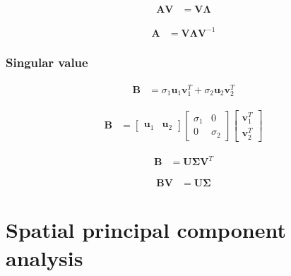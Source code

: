 \documentclass{article}
\begin{document}
\begin{align}
	\mathbf{A}\mathbf{V} & =\mathbf{V}\mathbf{\Lambda}
\end{align}

\begin{align}
	\mathbf{A} & =\mathbf{V}\mathbf{\Lambda}\mathbf{V}^{-1}
\end{align}

\subsubsection{Singular value}

\begin{align}
	\mathbf{B} & =\sigma_{1}\mathbf{u}_{1}\mathbf{v}_{1}^{T}+\sigma_{2}\mathbf{u}_{2}\mathbf{v}_{2}^{T}
\end{align}

\begin{align}
	\mathbf{B} & =\left[\begin{array}{cc}
		\mathbf{u}_{1} & \mathbf{u}_{2}\end{array}\right]\left[\begin{array}{cc}
		\sigma_{1} & 0\\
		0 & \sigma_{2}
	\end{array}\right]\left[\begin{array}{c}
		\mathbf{v}_{1}^{T}\\
		\mathbf{v}_{2}^{T}
	\end{array}\right]
\end{align}

\begin{align}
	\mathbf{B} & =\mathbf{U}\mathbf{\Sigma}\mathbf{V}^{T}
\end{align}

\begin{align}
	\mathbf{B}\mathbf{V} & =\mathbf{U}\mathbf{\Sigma}
\end{align}

\section{Spatial principal component analysis}



\end{document}
